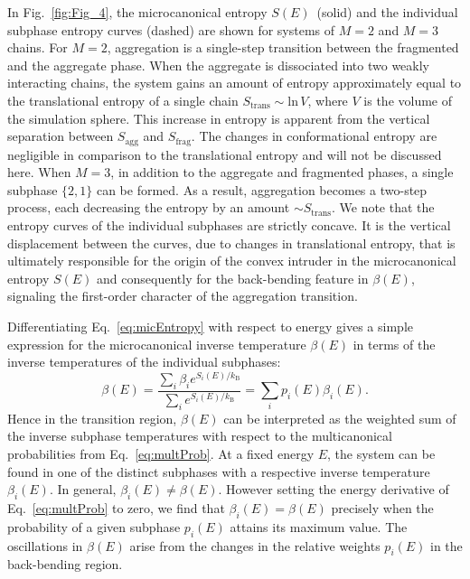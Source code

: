 \documentclass[12pt]{report}
\begin{document}
%
In Fig.~\ref{fig:Fig_4}, the microcanonical entropy $S(E)$~(solid) and
the individual subphase entropy curves (dashed) are shown
for systems of $M = 2$ and $M = 3$ chains. For $M=2$, aggregation 
is a single-step transition between the fragmented and the aggregate 
phase. When the aggregate is dissociated into two weakly 
interacting chains, the system gains an amount of entropy approximately
equal to the translational entropy of a single chain 
$S_{\mathrm{trans}} \sim \mathrm{ln}\,V$, where $V$ is the 
volume of the simulation sphere. This increase in entropy is apparent 
from the vertical separation between $S_{\mathrm{agg}}$ 
and $S_{\mathrm{frag}}$. The changes in conformational entropy
are negligible in comparison to the translational entropy and will
not be discussed here.  When $M = 3$, in addition to the aggregate and 
fragmented phases, a single subphase $\{2,1\}$ can be formed. As a result, 
aggregation becomes a two-step process, each decreasing the entropy
by an amount $\sim S_{\mathrm{trans}}$. We note that the entropy
curves of the individual subphases 
are strictly concave. It is the vertical displacement between the curves,
due to changes in translational entropy, that is ultimately responsible for
the origin 
of the convex intruder in the microcanonical entropy $S(E)$ and
consequently for the back-bending feature in $\beta(E)$, signaling the
first-order character of the aggregation transition. 

Differentiating Eq.~\eqref{eq:micEntropy} with respect to energy gives
a simple expression for the microcanonical inverse temperature $\beta(E)$ 
in terms of the inverse temperatures of the individual subphases:
%
\begin{equation}
\beta(E) = \frac{\sum_{i}\beta_{i}e^{S_{i}(E)/k_{\mathrm{B}}}}{
\sum_{i}e^{S_{i}(E)/k_{\mathrm{B}}}}
= \sum_{i} p_{i}(E)\beta_{i}(E).
\end{equation}
%
Hence in the transition region, $\beta(E)$ can be interpreted as the 
weighted sum of the inverse subphase temperatures with respect
to the multicanonical probabilities from Eq.~\eqref{eq:multProb}.
At a fixed energy $E$, the system can be found in one of the distinct
subphases with a respective inverse temperature $\beta_{i}(E)$. 
In general, $\beta_{i}(E) \neq \beta(E)$. However setting the energy
derivative of Eq.~\eqref{eq:multProb} to zero, we find that
$\beta_{i}(E) = \beta(E)$ precisely when the probability of a given
subphase 
$p_{i}(E)$ attains its maximum value. The oscillations in $\beta(E)$ 
arise from the changes in the relative weights $p_{i}(E)$ in
the back-bending region.
\end{document}
